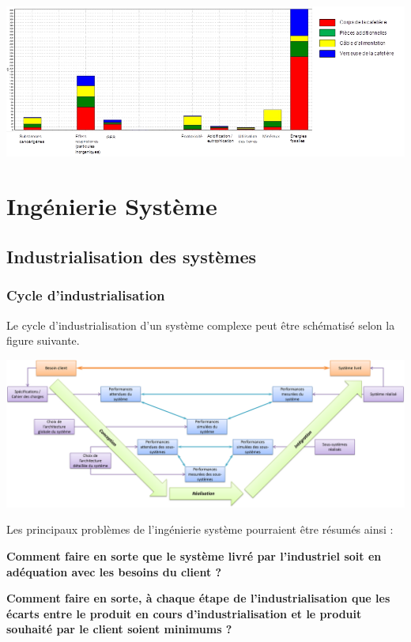 \documentclass[11pt,oneside]{article}
\begin{document}
\begin{exemple}
\begin{center}
\includegraphics[width=.8\textwidth]{png/acv3}
\end{center}

\end{exemple}

\section{Ingénierie Système}

\subsection{Industrialisation des systèmes}
\subsubsection{Cycle d'industrialisation}
Le cycle d'industrialisation d'un système complexe peut être schématisé selon la figure suivante.

\begin{center}
\includegraphics[width=\textwidth]{png/cycle}
\end{center}

\begin{prob}
Les principaux problèmes de l'ingénierie système pourraient être résumés ainsi :

\textbf{Comment faire en sorte que le système livré par l'industriel soit en adéquation avec les besoins du client ?}

\textbf{Comment faire en sorte, à chaque étape de l'industrialisation que les écarts entre le produit en cours d'industrialisation et le produit souhaité par le client soient minimums ?}
\end{prob}
\end{document}
